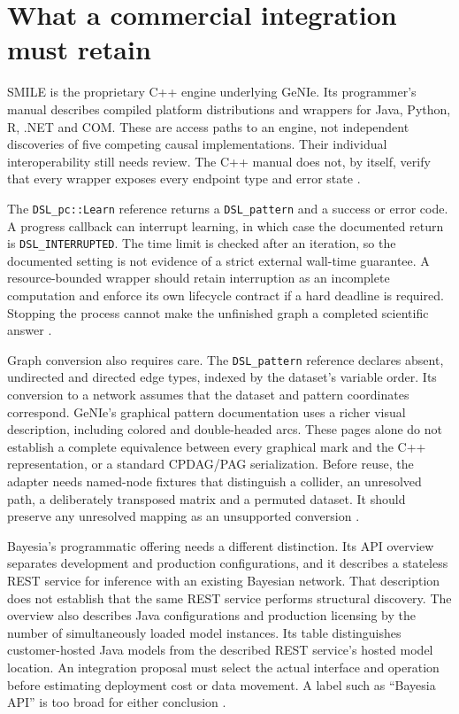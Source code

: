 \section{What a commercial integration must retain}

SMILE is the proprietary C++ engine underlying GeNIe. Its programmer's manual
describes compiled platform distributions and wrappers for Java, Python, R,
.NET and COM. These are access paths to an engine, not independent discoveries
of five competing causal implementations. Their individual interoperability
still needs review. The C++ manual does not, by itself, verify that every
wrapper exposes every endpoint type and error state
\citep{exec13_smile_intro}.

The \texttt{DSL\_pc::Learn} reference returns a \texttt{DSL\_pattern} and a
success or error code. A progress callback can interrupt learning, in which
case the documented return is \texttt{DSL\_INTERRUPTED}. The time limit is
checked after an iteration, so the documented setting is not evidence of a
strict external wall-time guarantee. A resource-bounded wrapper should retain
interruption as an incomplete computation and enforce its own lifecycle
contract if a hard deadline is required. Stopping the process cannot make
the unfinished graph a completed scientific answer
\citep{exec13_smile_pc}.

Graph conversion also requires care. The \texttt{DSL\_pattern} reference
declares absent, undirected and directed edge types, indexed by the dataset's
variable order. Its conversion to a network assumes that the dataset and
pattern coordinates correspond. GeNIe's graphical pattern documentation
uses a richer visual description, including colored and double-headed arcs.
These pages alone do not establish a complete equivalence between every
graphical mark and the C++ representation, or a standard CPDAG/PAG
serialization. Before reuse, the adapter needs named-node fixtures that
distinguish a collider, an unresolved path, a deliberately transposed
matrix and a permuted dataset. It should preserve any unresolved mapping
as an unsupported conversion
\citep{exec13_smile_pattern,exec13_genie_pattern}.

Bayesia's programmatic offering needs a different distinction. Its API overview
separates development and production configurations, and it describes a
stateless REST service for inference with an existing Bayesian network.
That description does not establish that the same REST service performs
structural discovery. The overview also describes Java configurations and
production licensing by the number of simultaneously loaded model instances.
Its table distinguishes customer-hosted Java models from the described REST
service's hosted model location. An integration proposal must select the
actual interface and operation before estimating deployment cost or data
movement. A label such as ``Bayesia API'' is too broad for either conclusion
\citep{exec13_bayesia_api}.

